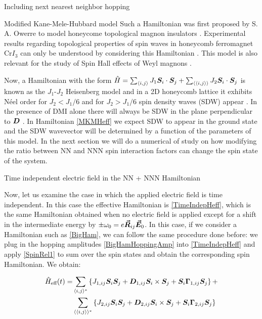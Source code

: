 \begin{section}{Including next nearest neighbor hopping}
\begin{subsection}{Modified Kane-Mele-Hubbard model}
Such a Hamiltonian was first proposed by S. A. Owerre to model honeycome topological magnon insulators \cite{Owerre2016} \cite{Elyasi2018}. Experimental results regarding topological properties of spin waves in honeycomb ferromagnet Cr$I_3$ can only be understood by considering this Hamiltonian \cite{Chen2018}. This model is also relevant for the study of Spin Hall effects of Weyl magnons \cite{Zyuzin2018} \cite{Sekine2016}.

Now, a Hamiltonian with the form $\hat{H} = \sum_{\langle i,j \rangle} J_1 \boldsymbol{S}_i\cdot\boldsymbol{S}_j + \sum_{\langle \langle i,j \rangle \rangle} J_2\boldsymbol{S}_i\cdot\boldsymbol{S}_j$ is known as the $J_1$-$J_2$ Heisenberg model and in a 2D honeycomb lattice it exhibits N\'eel order for $J_2 < J_1 / 6$ and for $J_2 > J_1 / 6$ spin density waves (SDW) appear \cite{Mulder2010}. In the presence of DMI alone there will always be SDW in the plane perpendicular to $\boldsymbol{D}$ \cite{Uchida2006}. In Hamiltonian \ref{MKMHeff} we expect SDW to appear in the ground state and the SDW wavevector will be determined by a function of the parameters of this model. In the next section we will do a numerical of study on how modifying the ratio between NN and NNN spin interaction factors can change the spin state of the system.

\end{subsection}

\begin{subsection}{Time independent electric field in the NN + NNN Hamiltonian}

Now, let us examine the case in which the applied electric field is time independent. In this case the effective Hamiltonian is \ref{TimeIndepHeff}, which is the same Hamiltonian obtained when no electric field is applied except for a shift in the intermediate energy by $\pm \omega_0 = e\boldsymbol{\vec{R}}_{ij}\boldsymbol{\vec{E}}_0$. In this case, if we consider a Hamiltonian such as \ref{BigHam}, we can follow the same procedure done before: we plug in the hopping amplitudes \ref{BigHamHoppingAmp} into \ref{TimeIndepHeff} and apply \ref{SpinRel1} to sum over the spin states and obtain the corresponding spin Hamiltonian. We obtain:

\begin{align}
\hat{H}_{\text{eff}}(t) = &\sum_{\langle i,j \rangle ^*} \left\{ J_{1,ij}\boldsymbol{S}_i\boldsymbol{S}_j + \boldsymbol{D}_{1,ij} \boldsymbol{S}_i \times \boldsymbol{S}_j + \boldsymbol{S}_i\boldsymbol{\Gamma}_{1,ij}\boldsymbol{S}_j\right\} + \nonumber \\
&\sum_{\langle \langle i,j \rangle \rangle^*} \left\{ J_{2,ij}\boldsymbol{S}_i\boldsymbol{S}_j + \boldsymbol{D}_{2,ij} \boldsymbol{S}_i \times \boldsymbol{S}_j + \boldsymbol{S}_i\boldsymbol{\Gamma}_{2,ij}\boldsymbol{S}_j\right\}
\end{align}


\end{subsection}
\end{section}
